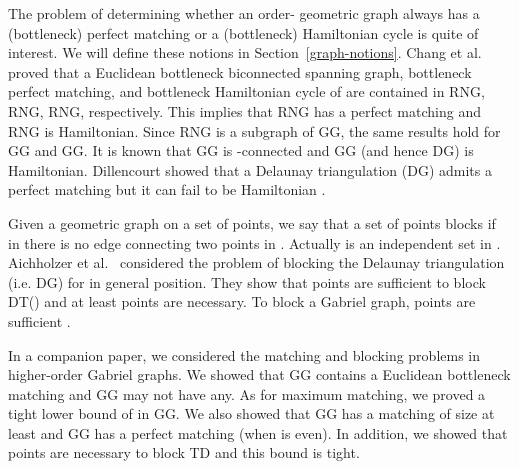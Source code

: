 \documentclass[11pt,a4paper]{article}
\newcommand{\kTD}[2]{\text{-}TD#2}
\newcommand{\kDT}[2]{\text{-}DG#2}
\newcommand{\kGG}[2]{\text{-}GG#2}
\newcommand{\kRNG}[2]{\text{-}RNG#2}
\begin{document}
The problem of determining whether an order- geometric graph always has a (bottleneck) perfect matching or a (bottleneck) Hamiltonian cycle is quite of interest. We will define these notions in Section~\ref{graph-notions}. 
Chang et al. \cite{Chang1992b, Chang1992, Chang1991} proved that a Euclidean bottleneck biconnected spanning graph, bottleneck perfect matching, and bottleneck Hamiltonian cycle of  are contained in \kRNG{1}{}, \kRNG{16}{}, \kRNG{19}{}, respectively. This implies that \kRNG{16}{} has a perfect matching and \kRNG{19}{} is Hamiltonian. Since \kRNG{k}{} is a subgraph of \kGG{k}{}, the same results hold for \kGG{16}{} and \kGG{19}{}. It is known that \kGG{k}{} is -connected \cite{Bose2013} and 
\kGG{15}{} (and hence \kDT{15}{}) is Hamiltonian. Dillencourt showed that a Delaunay triangulation (\kDT{0}{}) admits a perfect matching \cite{Dillencourt1990} but it can fail to be Hamiltonian \cite{Dillencourt1987a}. 

Given a geometric graph  on a set  of  points, we say that a set  of points blocks  if in  there is no edge connecting two points in . Actually  is an independent set in .
Aichholzer et al.~\cite{Aichholzer2013} considered the problem of blocking the Delaunay triangulation (i.e. \kDT{0}{}) for  in general position. They show that  points are sufficient to block DT() and at least  points are necessary. To block a Gabriel graph,  points are sufficient \cite{Aronov2013}.

In a companion paper, we considered the matching and blocking problems in higher-order Gabriel graphs. We showed that \kGG{10}{} contains a Euclidean bottleneck matching and \kGG{8}{} may not have any. As for maximum matching, we proved a tight lower bound of  in \kGG{0}{}. We also showed that \kGG{1}{} has a matching of size at least  and \kGG{2}{} has a perfect matching (when  is even). In addition, we showed that  points are necessary to block \kTD{0}{} and this bound is tight.
\end{document}
